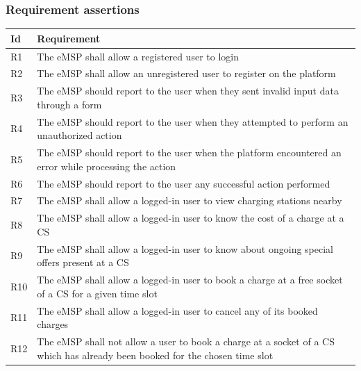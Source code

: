 \documentclass[11pt]{article}
\begin{document}
\subsubsection{Requirement assertions}

\begin{table}[H]
    \centering
    \setlength{\tabcolsep}{18pt}
    \renewcommand{\arraystretch}{1.2}
    \begin{tabularx}{\textwidth}{|>{\centering\hsize=0.1\hsize}X|>{\hsize=1.9\hsize}X|}
        \hline
        \textbf{Id} & \textbf{Requirement} \\
        \hline
        R1 & The eMSP shall allow a registered user to login \\
        \hline
        R2 & The eMSP shall allow an unregistered user to register on the platform \\
        \hline
        R3 & The eMSP should report to the user when they sent invalid input data through a form \\
        \hline
        R4 & The eMSP should report to the user when they attempted to perform an unauthorized action \\
        \hline
        R5 & The eMSP should report to the user when the platform encountered an error while processing the action \\
        \hline
        R6 & The eMSP should report to the user any successful action performed \\
        \hline
        R7 & The eMSP shall allow a logged-in user to view charging stations nearby \\
        \hline
        R8 & The eMSP shall allow a logged-in user to know the cost of a charge at a CS \\
        \hline
        R9 & The eMSP shall allow a logged-in user to know about ongoing special offers present at a CS \\
        \hline
        R10 & The eMSP shall allow a logged-in user to book a charge at a free socket of a CS for a given time slot \\
        \hline
        R11 & The eMSP shall allow a logged-in user to cancel any of its booked charges \\
        \hline
        R12 & The eMSP shall not allow a user to book a charge at a socket of a CS which has already been booked for the chosen time slot \\

\end{tabularx}
\end{table}
\end{document}
